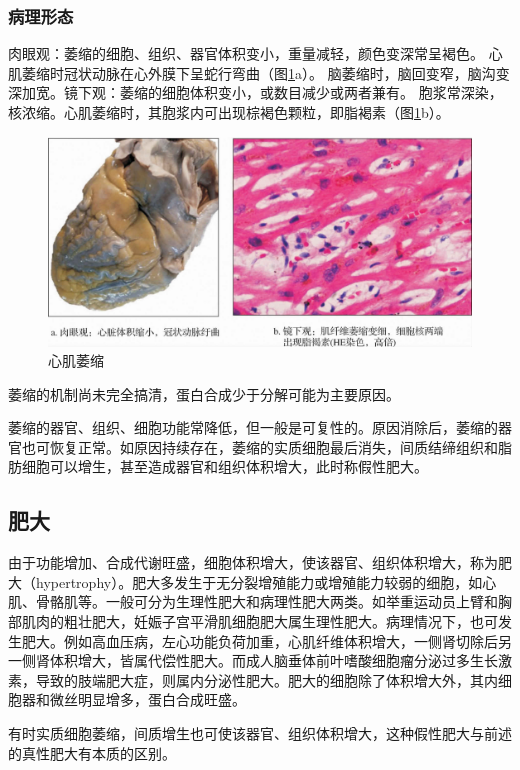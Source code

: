 \subsubsection{病理形态}

肉眼观：萎缩的细胞、组织、器官体积变小，重量减轻，颜色变深常呈褐色。
心肌萎缩时冠状动脉在心外膜下呈蛇行弯曲（图\ref{fig1-1}a）。
脑萎缩时，脑回变窄，脑沟变深加宽。镜下观：萎缩的细胞体积变小，或数目减少或两者兼有。
胞浆常深染，核浓缩。心肌萎缩时，其胞浆内可出现棕褐色颗粒，即脂褐素（图\ref{fig1-1}b）。
\begin{figure}[!htbp]
	\centering
	\includegraphics[width=.8\textwidth]{./images/Image00002.jpg}
	\caption{心肌萎缩}
	\label{fig1-1}
\end{figure}

萎缩的机制尚未完全搞清，蛋白合成少于分解可能为主要原因。

萎缩的器官、组织、细胞功能常降低，但一般是可复性的。原因消除后，萎缩的器官也可恢复正常。如原因持续存在，萎缩的实质细胞最后消失，间质结缔组织和脂肪细胞可以增生，甚至造成器官和组织体积增大，此时称假性肥大。

\subsection{肥大}

由于功能增加、合成代谢旺盛，细胞体积增大，使该器官、组织体积增大，称为肥大（hypertrophy）。肥大多发生于无分裂增殖能力或增殖能力较弱的细胞，如心肌、骨骼肌等。一般可分为生理性肥大和病理性肥大两类。如举重运动员上臂和胸部肌肉的粗壮肥大，妊娠子宫平滑肌细胞肥大属生理性肥大。病理情况下，也可发生肥大。例如高血压病，左心功能负荷加重，心肌纤维体积增大，一侧肾切除后另一侧肾体积增大，皆属代偿性肥大。而成人脑垂体前叶嗜酸细胞瘤分泌过多生长激素，导致的肢端肥大症，则属内分泌性肥大。肥大的细胞除了体积增大外，其内细胞器和微丝明显增多，蛋白合成旺盛。

有时实质细胞萎缩，间质增生也可使该器官、组织体积增大，这种假性肥大与前述的真性肥大有本质的区别。

